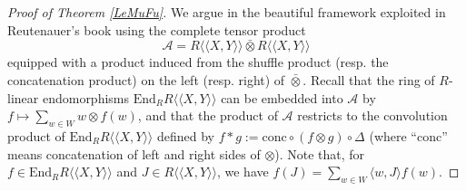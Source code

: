 \documentclass[10pt]{article}
\theoremstyle{definition}
\theoremstyle{remark}
\def\lp{\langle}
\def\rp{\rangle}
\def\la{\langle}
\def\ra{\rangle}
\def\lala{\la\!\la}
\def\rara{\ra\!\ra}
\begin{document}
\begin{proof}[Proof of Theorem \ref{LeMuFu}]
We argue in the beautiful framework exploited in Reutenauer's book \cite[1.5]{Reu}
using the complete tensor product
$$
\mathscr{A}=R\lala X,Y\rara \bar\otimes R\lala X,Y\rara
$$
equipped with a product induced from 
the shuffle product (resp. the concatenation product)
on the left (resp. right) of $\bar\otimes$. 
Recall that the ring of
$R$-linear endomorphisms $\mathrm{End}_RR\lala X,Y\rara$
can be embedded into $\mathscr{A}$ by 
$f\mapsto \sum_{w\in W} w\otimes f(w)$, and that the product of 
$\mathscr{A}$ restricts to the convolution product of $\mathrm{End}_RR\lala X,Y\rara$
defined by $f\ast g:=\mathrm{conc}\circ(f\otimes g)\circ \Delta$
(where ``$\mathrm{conc}$'' means concatenation of left and right sides of $\otimes$).
Note that, for $f\in\mathrm{End}_R R\lala X,Y\rara$ and  $J\in R\lala X,Y\rara$,
we have $f(J)=\sum_{w\in W} \lp w,J\rp f(w)$.


\end{proof}
\end{document}

